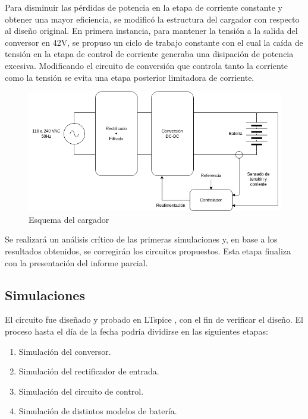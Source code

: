 Para disminuir las pérdidas de potencia en la etapa de corriente constante y obtener una mayor eficiencia, se modificó la estructura del cargador con respecto al diseño original. 
En primera instancia, para mantener la tensión a la salida del conversor en 42V, se propuso un ciclo de trabajo constante 
con el cual la caída de tensión en la etapa de control de corriente generaba una disipación de potencia excesiva.
Modificando el circuito de conversión que controla tanto la corriente como la tensión se evita una etapa posterior limitadora de corriente.

\begin{figure}
    \centering
    \includegraphics[width=\textwidth]{images/esquema_cargador_v2.png}
    \caption{Esquema del cargador}
    \label{fig:esquema_cargador}
\end{figure}

Se realizará un análisis crítico de las primeras simulaciones y, en base a los resultados obtenidos, 
se corregirán los circuitos propuestos. 
Esta etapa finaliza con la presentación del informe parcial. 

\subsection{Simulaciones}
El circuito fue diseñado y probado en LTspice \cite{ltspice}, con el fin de verificar el diseño.
El proceso hasta el día de la fecha podría dividirse en las siguientes etapas:
\begin{enumerate}
    \item Simulación del conversor.
    \item Simulación del rectificador de entrada.
    \item Simulación del circuito de control.
    \item Simulación de distintos modelos de batería.
\end{enumerate}

